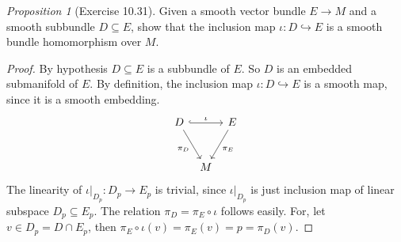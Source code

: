 \documentclass[a4paper]{article}
\theoremstyle{remark}
\newtheorem{prop}{Proposition}
\newcommand{\subhim}{\subseteq} %
\begin{document}
\begin{prop}[Exercise 10.31]
Given a smooth vector bundle $E \to M$ and a smooth subbundle $D \subhim E$, show that the inclusion map $\iota : D \hookrightarrow E$ is a smooth bundle homomorphism over $M$.
\end{prop}
\begin{proof}
By hypothesis $D \subhim E$ is a subbundle of $E$. So $D$ is an embedded submanifold of $E$. By definition, the inclusion map $\iota : D \hookrightarrow E$ is a smooth map, since it is a smooth embedding.
\[
\begin{tikzcd}[column sep=tiny, row sep=large]
D \arrow[rr,"\iota",hook] \arrow[dr,"\pi_D",swap] && E \arrow[dl,"\pi_E"] \\
&M&
\end{tikzcd}
\]
The linearity of $\iota|_{D_p} : D_p \to E_p$ is trivial, since $\iota|_{D_p}$ is just inclusion map of linear subspace $D_p \subhim E_p$. The relation $\pi_D = \pi_E \circ \iota$ follows easily. For, let $v \in D_p = D \cap E_p$, then $\pi_E \circ \iota(v) = \pi_E (v) = p = \pi_D (v)$.
\end{proof}
\end{document}
